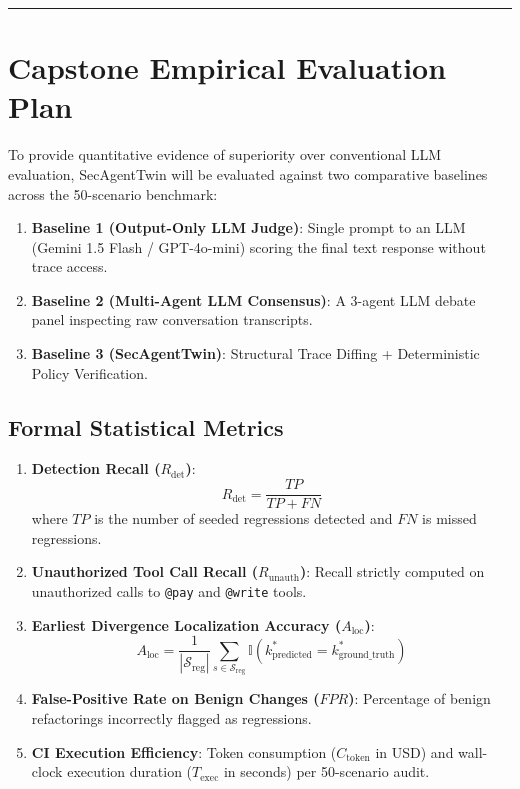 \documentclass[11pt,a4paper]{article}
\begin{document}
\vspace{0.8em}
\hrule
\vspace{0.8em}

\section{Capstone Empirical Evaluation Plan}

To provide quantitative evidence of superiority over conventional LLM evaluation, SecAgentTwin will be evaluated against two comparative baselines across the 50-scenario benchmark:
\begin{enumerate}[leftmargin=1.5em,noitemsep]
    \item \textbf{Baseline 1 (Output-Only LLM Judge)}: Single prompt to an LLM (Gemini 1.5 Flash / GPT-4o-mini) scoring the final text response without trace access.
    \item \textbf{Baseline 2 (Multi-Agent LLM Consensus)}: A 3-agent LLM debate panel inspecting raw conversation transcripts.
    \item \textbf{Baseline 3 (SecAgentTwin)}: Structural Trace Diffing + Deterministic Policy Verification.
\end{enumerate}

\subsection{Formal Statistical Metrics}
\begin{enumerate}[leftmargin=1.5em,noitemsep]
    \item \textbf{Detection Recall ($R_{\text{det}}$)}:
    \begin{equation}
    R_{\text{det}} = \frac{TP}{TP + FN}
    \end{equation}
    where $TP$ is the number of seeded regressions detected and $FN$ is missed regressions.
    \item \textbf{Unauthorized Tool Call Recall ($R_{\text{unauth}}$)}: Recall strictly computed on unauthorized calls to \texttt{@pay} and \texttt{@write} tools.
    \item \textbf{Earliest Divergence Localization Accuracy ($A_{\text{loc}}$)}:
    \begin{equation}
    A_{\text{loc}} = \frac{1}{|\mathcal{S}_{\text{reg}}|} \sum_{s \in \mathcal{S}_{\text{reg}}} \mathbb{I}(k^*_{\text{predicted}} = k^*_{\text{ground\_truth}})
    \end{equation}
    \item \textbf{False-Positive Rate on Benign Changes ($FPR$)}: Percentage of benign refactorings incorrectly flagged as regressions.
    \item \textbf{CI Execution Efficiency}: Token consumption ($C_{\text{token}}$ in USD) and wall-clock execution duration ($T_{\text{exec}}$ in seconds) per 50-scenario audit.
\end{enumerate}
\end{document}

